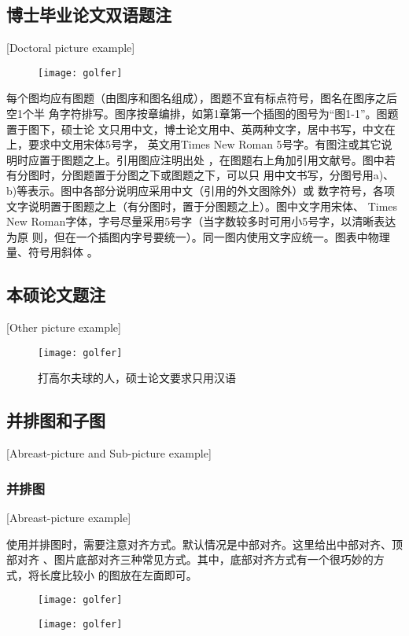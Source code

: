 \subsection{博士毕业论文双语题注}[Doctoral picture example]
\begin{figure}[htpb]
\centering
\texttt{[image: golfer]}
\end{figure}

每个图均应有图题（由图序和图名组成），图题不宜有标点符号，图名在图序之后空1个半
角字符排写。图序按章编排，如第1章第一个插图的图号为“图1-1”。图题置于图下，硕士论
文只用中文，博士论文用中、英两种文字，居中书写，中文在上，要求中文用宋体5号字，
英文用Times New Roman 5号字。有图注或其它说明时应置于图题之上。引用图应注明出处
，在图题右上角加引用文献号。图中若有分图时，分图题置于分图之下或图题之下，可以只
用中文书写，分图号用a)、b)等表示。图中各部分说明应采用中文（引用的外文图除外）或
数字符号，各项文字说明置于图题之上（有分图时，置于分图题之上）。图中文字用宋体、
Times New Roman字体，字号尽量采用5号字（当字数较多时可用小5号字，以清晰表达为原
则，但在一个插图内字号要统一）。同一图内使用文字应统一。图表中物理量、符号用斜体
。
\subsection{本硕论文题注}[Other picture example]
\begin{figure}[h]
\centering
\texttt{[image: golfer]}
\caption{打高尔夫球的人，硕士论文要求只用汉语}
\end{figure}

\subsection{并排图和子图}[Abreast-picture and Sub-picture example]
\subsubsection{并排图}[Abreast-picture example]

使用并排图时，需要注意对齐方式。默认情况是中部对齐。这里给出中部对齐、顶部对齐
、图片底部对齐三种常见方式。其中，底部对齐方式有一个很巧妙的方式，将长度比较小
的图放在左面即可。

\begin{figure}[htbp]
\centering
\begin{minipage}{0.4\textwidth}
\centering
\texttt{[image: golfer]}
\end{minipage}
\centering
\begin{minipage}{0.4\textwidth}
\centering
\texttt{[image: golfer]}
\end{minipage}
\end{figure}

